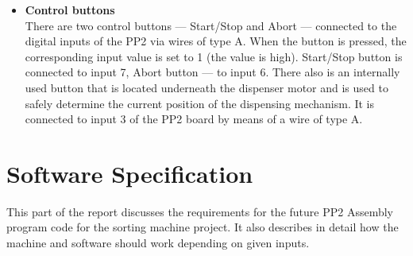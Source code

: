 \documentclass[a4paper,oneside,11pt]{report}
\begin{document}
\begin{itemize}
\pagebreak

\item \textbf{Control buttons}\\
    There are two control buttons --- Start/Stop and Abort --- connected to the digital inputs of the PP2 via wires of type A. When the button is pressed, the corresponding input value is set to 1 (the value is high). Start/Stop button is connected to input 7, Abort button --- to input 6. There also is an internally used button that is located underneath the dispenser motor and is used to safely determine the current position of the dispensing mechanism. It is connected to input 3 of the PP2 board by means of a wire of type A.
\end{itemize}

\chapter{Software Specification}
This part of the report discusses the requirements for the future PP2 Assembly program code for the sorting machine project. It also describes in detail how the machine and software should work depending on given inputs.
\end{document}
